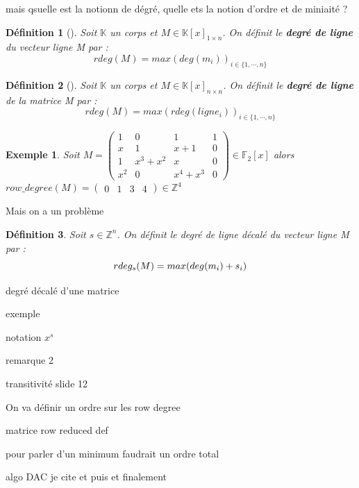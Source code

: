 \documentclass[a4paper,12pt]{report}  %
\theoremstyle{definitionstyle}
\newtheorem{definition}{Définition}[chapter] %
\theoremstyle{examplestyle}
\newtheorem{example}{Exemple}[chapter] %
\theoremstyle{remarkstyle}
\theoremstyle{propositionstyle}
\theoremstyle{theoremstyle}
\begin{document}
	mais qsuelle est la notionn de dégré, quelle ets la notion d'ordre et de miniaité ?
	
	
	\begin{definition}[\cite{clef_unique_0}]
		Soit $\mathbb{K}$ un corps et $M \in \mathbb{K}[x]_{1 \times n}$. On définit le \textbf{degré de ligne} du vecteur ligne M par : 
		$$rdeg(M)=max(deg(m_i))_{i\in\{1, \cdots, n\}}$$
	\end{definition}
	
	\begin{definition}[\cite{clef_unique_0}]
		Soit $\mathbb{K}$ un corps et $M \in \mathbb{K}[x]_{n \times n}$. On définit le \textbf{degré de ligne} de la matrice M par :
		$$rdeg(M)=max(rdeg(ligne_i))_{i\in\{1, \cdots, n\}}$$
	\end{definition}
	
	\begin{example}
		Soit $M =
		\left(\begin{array}{rrrr}
			1 & 0 & 1 & 1 \\
			x & 1 & x + 1 & 0 \\
			1 & x^{3} + x^{2} & x & 0 \\
			x^{2} & 0 & x^{4} + x^{3} & 0
		\end{array}\right) \in \mathbb{F}_2[x]
		$
		alors $row\_degree(M)=\left(\begin{array}{rrrr}
			0 & 1 & 3 & 4
		\end{array}\right)\in \mathbb{Z}^4$
		
	\end{example}
	
	Mais on a un problème
	
	\begin{definition}
		Soit $s \in \mathbb{Z}^n$. On définit le degré de ligne décalé du vecteur ligne M par :
		$$rdeg_s(M)=max(deg(m_i)+s_i\\)$$
	\end{definition}
	degré décalé d'une matrice
	
	exemple
	
	notation $x^s$
	
	remarque 2
	
	transitivité slide 12
	
	On va définir un ordre sur les row degree
	
	
	
	matrice row reduced def
	
	
	pour parler d'un minimum faudrait un ordre total
	
	algo DAC
	 je cite \cite{clef_unique_2} et puis \cite{clef_unique_3} et finalement \cite{clef_unique_4}
	
\end{document}
